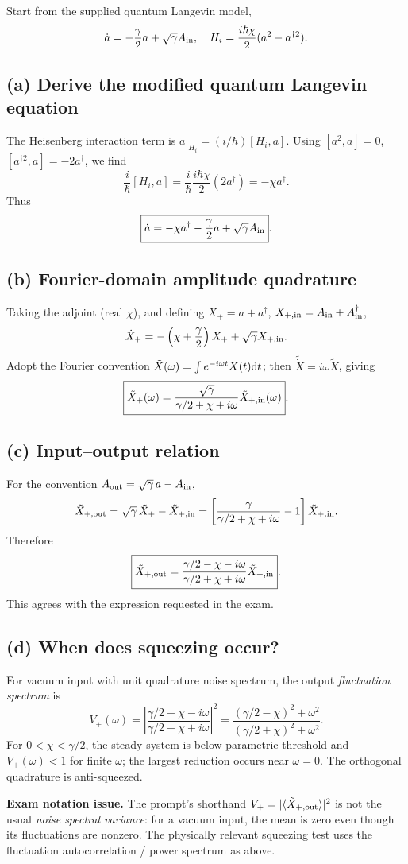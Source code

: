 
Start from the supplied quantum Langevin model,
\[
\dot a=-\frac\gamma2a+\sqrt\gamma A_{\rm in},\quad
H_i=\frac{i\hbar\chi}{2}(a^2-a^{\dagger2}).
\]

\subsection*{(a) Derive the modified quantum Langevin equation}
The Heisenberg interaction term is
\(\dot a|_{H_i}=(i/\hbar)[H_i,a]\).
Using \([a^2,a]=0\),
\([a^{\dagger2},a]=-2a^\dagger\), we find
\[
\frac i\hbar[H_i,a]
=\frac i\hbar\frac{i\hbar\chi}{2}(2a^\dagger)
=-\chi a^\dagger.
\]
Thus
\[
\boxed{\dot a=-\chi a^\dagger-\frac\gamma2a
+\sqrt\gamma A_{\rm in}}.
\]

\subsection*{(b) Fourier-domain amplitude quadrature}
Taking the adjoint (real \(\chi\)), and defining
\(X_+=a+a^\dagger\),
\(X_{+,\rm in}=A_{\rm in}+A_{\rm in}^\dagger\),
\[
\dot X_+=-\left(\chi+\frac\gamma2\right)X_+
+\sqrt\gamma X_{+,\rm in}.
\]
Adopt the Fourier convention
\(\tilde X(\omega)=\int e^{-i\omega t}X(t)\mathrm{d} t\);
then \(\widetilde{\dot X}=i\omega\tilde X\), giving
\[
\boxed{\tilde X_+(\omega)=
\frac{\sqrt\gamma}{\gamma/2+\chi+i\omega}
\tilde X_{+,\rm in}(\omega)}.
\]

\subsection*{(c) Input--output relation}
For the convention \(A_{\rm out}=\sqrt\gamma\,a-A_{\rm in}\),
\[
\tilde X_{+,\rm out}
=\sqrt\gamma\,\tilde X_+-\tilde X_{+,\rm in}
=\left[
\frac{\gamma}{\gamma/2+\chi+i\omega}-1\right]
\tilde X_{+,\rm in}.
\]
Therefore
\[
\boxed{\tilde X_{+,\rm out}=
\frac{\gamma/2-\chi-i\omega}
{\gamma/2+\chi+i\omega}
\tilde X_{+,\rm in}}.
\]
This agrees with the expression requested in the exam.

\subsection*{(d) When does squeezing occur?}
For vacuum input with unit quadrature noise spectrum,
the output \emph{fluctuation spectrum} is
\[
V_+(\omega)=\left|
\frac{\gamma/2-\chi-i\omega}
{\gamma/2+\chi+i\omega}\right|^2
=\boxed{\frac{(\gamma/2-\chi)^2+\omega^2}
{(\gamma/2+\chi)^2+\omega^2}}.
\]
For \(\boxed{0<\chi<\gamma/2}\), the steady
system is below parametric threshold and
\(V_+(\omega)<1\) for finite \(\omega\);
the largest reduction occurs near \(\omega=0\).
The orthogonal quadrature is anti-squeezed.
\begin{cautionbox}
\textbf{Exam notation issue.} The prompt's shorthand
\(V_+=|\langle\tilde X_{+,\rm out}\rangle|^2\)
is not the usual \emph{noise spectral variance}:
for a vacuum input, the mean is zero even though
its fluctuations are nonzero. The physically
relevant squeezing test uses the fluctuation
autocorrelation / power spectrum as above.
\end{cautionbox}

